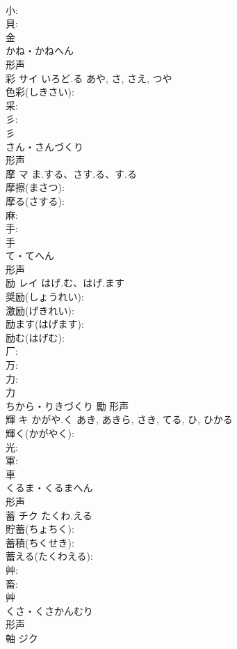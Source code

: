 \documentclass[8pt]{extreport}
\begin{document}
\begin{CJK}{UTF8}{min}
\\	小: 
\\	貝: 
\\	金	
\\	かね・かねへん	
\\	形声 
\\	彩	サイ	いろど.る	あや, さ, さえ, つや	
\\	色彩(しきさい): 
\\	采: 
\\	彡: 
\\	彡	
\\	さん・さんづくり	
\\	形声 
\\	摩	マ	ま.する、さす.る、す.る		
\\	摩擦(まさつ): 
\\	摩る(さする): 
\\	麻: 
\\	手: 
\\	手	
\\	て・てへん	
\\	形声 
\\	励	レイ	はげ.む、はげ.ます		
\\	奨励(しょうれい): 
\\	激励(げきれい): 
\\	励ます(はげます): 
\\	励む(はげむ): 
\\	厂: 
\\	万: 
\\	力: 
\\	力	
\\	ちから・りきづくり	勵	形声 
\\	輝	キ	かがや.く	あき, あきら, さき, てる, ひ, ひかる	
\\	輝く(かがやく): 
\\	光: 
\\	軍: 
\\	車	
\\	くるま・くるまへん	
\\	形声 
\\	蓄	チク	たくわ.える		
\\	貯蓄(ちょちく): 
\\	蓄積(ちくせき): 
\\	蓄える(たくわえる): 
\\	艸: 
\\	畜: 
\\	艸	
\\	くさ・くさかんむり	
\\	形声 
\\	軸	ジク			

\end{CJK}
\end{document}
